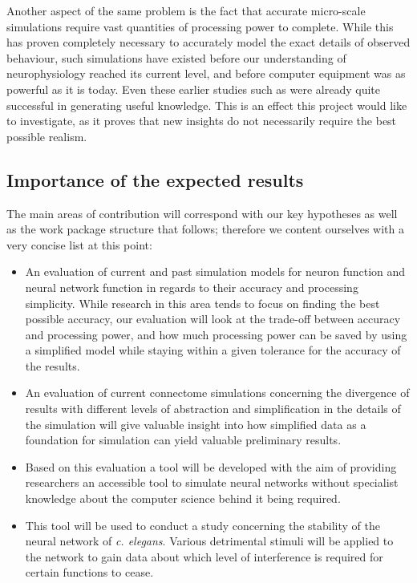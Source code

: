 \documentclass[a4paper,11pt]{article}
\begin{document}
Another aspect of the same problem is the fact that accurate micro-scale simulations require vast quantities of processing power to complete. While this has proven completely necessary to accurately model the exact details of observed behaviour, such simulations have existed before our understanding of neurophysiology reached its current level, and before computer equipment was as powerful as it is today. Even these earlier studies such as \citep{Kimura2005} were already quite successful in generating useful knowledge. This is an effect this project would like to investigate, as it proves that new insights do not necessarily require the best possible realism. 

\subsection{Importance of the expected results}

The main areas of contribution will correspond with our key hypotheses as well as the work package structure that follows; therefore we content ourselves with a very concise list at this point:
\begin{itemize} 
  \item An evaluation of current and past simulation models for neuron function and neural network function in regards to their accuracy and processing simplicity. While research in this area tends to focus on finding the best possible accuracy, our evaluation will look at the trade-off between accuracy and processing power, and how much processing power can be saved by using a simplified model while staying within a given tolerance for the accuracy of the results.
  \item An evaluation of current connectome simulations concerning the divergence of results with different levels of abstraction and simplification in the details of the simulation will give valuable insight into how simplified data as a foundation for simulation can yield valuable preliminary results.
  \item Based on this evaluation a tool will be developed with the aim of providing researchers an accessible tool to simulate neural networks without specialist knowledge about the computer science behind it being required.
  \item This tool will be used to conduct a study concerning the stability of the neural network of \emph{c. elegans}. Various detrimental stimuli will be applied to the network to gain data about which level of interference is required for certain functions to cease. 
\end{itemize}
\end{document}
